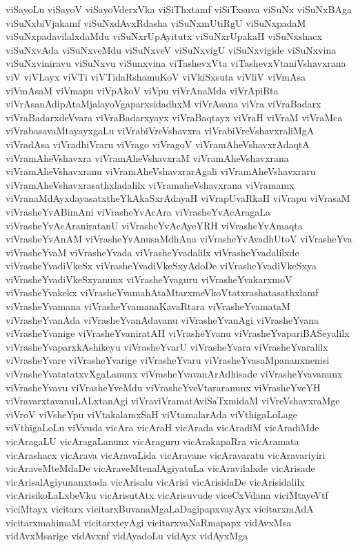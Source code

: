 {viSayoLu
viSayoV
viSayoVderxVka
viSiThxtamf
viSiTxsuva
viSuNx
viSuNxBAga
viSuNxbiVjakamf
viSuNxdAvxRdasha
viSuNxmUtiRgU
viSuNxpadaM
viSuNxpadavilalxdaMdu
viSuNxrUpAyitutx
viSuNxrUpakaH
viSuNxshacx
viSuNxvAda
viSuNxveMdu
viSuNxveV
viSuNxvigU
viSuNxvigide
viSuNxvina
viSuNxviniravu
viSuNxvu
viSunxvina
viTashevxVta
viTashevxVtaniVshavxrana
viV
viVLayx
viVTi
viVTidaRshamuKoV
viVkiSxsuta
viVliV
viVmAsa
viVmAsaM
viVmapu
viVpAkoV
viVpu
viVrAnaMda
viVrApiRta
viVrAsanAdipAtaMjalayoVgaparxsidadhxM
viVrAsana
viVra
viVraBadarx
viVraBadarxdeVvara
viVraBadarxyayx
viVraBaqtayx
viVraH
viVraM
viVraMca
viVrabasavaMtayayxgaLu
viVrabiVreVshavxra
viVrabiVreVshavxraliMgA
viVradAsa
viVradhiVraru
viVrago
viVragoV
viVramAheVshavxrAdaqtA
viVramAheVshavxra
viVramAheVshavxraM
viVramAheVshavxrana
viVramAheVshavxranu
viVramAheVshavxrarAgali
viVramAheVshavxraru
viVramAheVshavxrasathxladalilx
viVramaheVshavxrana
viVramamx
viVranaMdAyxdayasatxtheYkAkaSxrAdayaH
viVrapUvaRkaH
viVrapu
viVrasaM
viVrasheYvABimAni
viVrasheYvAcAra
viVrasheYvAcAragaLa
viVrasheYvAcAraniratanU
viVrasheYvAcAyeYRH
viVrasheYvAmaqta
viVrasheYvAnAM
viVrasheYvAnusaMdhAna
viVrasheYvAvadhUtoV
viVrasheYva
viVrasheYvaM
viVrasheYvada
viVrasheYvadalilx
viVrasheYvadalilxde
viVrasheYvadiVkeSx
viVrasheYvadiVkeSxyAdoDe
viVrasheYvadiVkeSxya
viVrasheYvadiVkeSxyanunx
viVrasheYvaguru
viVrasheYvakarxmoV
viVrasheYvakekx
viVrasheYvamahAtaMtarxmeVkoVtatxrashatasathxlamf
viVrasheYvamana
viVrasheYvamanaKavaRtara
viVrasheYvamataM
viVrasheYvanAda
viVrasheYvanAdavanu
viVrasheYvanAgi
viVrasheYvana
viVrasheYvanige
viVrasheYvaniratAH
viVrasheYvanu
viVrasheYvapariBASeyalilx
viVrasheYvaparxkAshikeyu
viVrasheYvarU
viVrasheYvara
viVrasheYvaralilx
viVrasheYvare
viVrasheYvarige
viVrasheYvaru
viVrasheYvasaMpananxnenisi
viVrasheYvatatatxvXgaLanunx
viVrasheYvavanArAdhisade
viVrasheYvavanunx
viVrasheYvavu
viVrasheYveMdu
viVrasheYveVtararanunx
viVrasheYveYH
viVravarxtavanuLALxtanAgi
viVraviVramatAviSaTxmidaM
viVreVshavxraMge
viVroV
viVsheYpu
viVtakalamxSaH
viVtamalarAda
viVthigaLoLage
viVthigaLoLu
viVvuda
vicAra
vicAraH
vicArada
vicAradiM
vicAradiMde
vicAragaLU
vicAragaLanunx
vicAraguru
vicArakapaRra
vicAramata
vicArashacx
vicArava
vicAravaLida
vicAravane
vicAravaratu
vicAravariyiri
vicAraveMteMdaDe
vicAraveMtenalAgiyatuLa
vicAravilalxde
vicArisade
vicArisalAgiyunanxtada
vicArisalu
vicArisi
vicArisidaDe
vicArisidalilx
vicArisikoLaLxbeVku
vicArisutAtx
vicArisuvude
viceCxVdana
viciMtayeVtf
viciMtayx
vicitarx
vicitarxBuvanaMgaLaDagipapxvayAyx
vicitarxmAdA
vicitarxmahimaM
vicitarxteyAgi
vicitarxvaNaRmapapx
vidAvxMsa
vidAvxMsarige
vidAvxnf
vidAyadoLu
vidAyx
vidAyxMga
}
